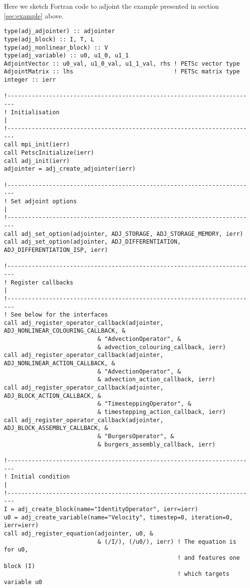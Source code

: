 \documentclass[10pt,authoryear]{elsarticle}
\begin{document}
Here we sketch Fortran code to adjoint the example presented in section \ref{sec:example} above.
\begin{verbatim}
type(adj_adjointer) :: adjointer
type(adj_block) :: I, T, L
type(adj_nonlinear_block) :: V
type(adj_variable) :: u0, u1_0, u1_1
AdjointVector :: u0_val, u1_0_val, u1_1_val, rhs ! PETSc vector type
AdjointMatrix :: lhs                             ! PETSc matrix type
integer :: ierr

!------------------------------------------------------------------------
! Initialisation                                                        |
!------------------------------------------------------------------------
call mpi_init(ierr)
call PetscInitialize(ierr)
call adj_init(ierr)
adjointer = adj_create_adjointer(ierr)

!------------------------------------------------------------------------
! Set adjoint options                                                  |
!------------------------------------------------------------------------
call adj_set_option(adjointer, ADJ_STORAGE, ADJ_STORAGE_MEMORY, ierr)
call adj_set_option(adjointer, ADJ_DIFFERENTIATION, ADJ_DIFFERENTIATION_ISP, ierr)

!------------------------------------------------------------------------
! Register callbacks                                                    |
!------------------------------------------------------------------------
! See below for the interfaces
call adj_register_operator_callback(adjointer, ADJ_NONLINEAR_COLOURING_CALLBACK, &
                           & "AdvectionOperator", &
                           & advection_colouring_callback, ierr)
call adj_register_operator_callback(adjointer, ADJ_NONLINEAR_ACTION_CALLBACK, &
                           & "AdvectionOperator", &
                           & advection_action_callback, ierr)
call adj_register_operator_callback(adjointer, ADJ_BLOCK_ACTION_CALLBACK, &
                           & "TimesteppingOperator", &
                           & timestepping_action_callback, ierr)
call adj_register_operator_callback(adjointer, ADJ_BLOCK_ASSEMBLY_CALLBACK, &
                           & "BurgersOperator", &
                           & burgers_assembly_callback, ierr)

!------------------------------------------------------------------------
! Initial condition                                                     |
!------------------------------------------------------------------------
I = adj_create_block(name="IdentityOperator", ierr=ierr)
u0 = adj_create_variable(name="Velocity", timestep=0, iteration=0, ierr=ierr)
call adj_register_equation(adjointer, u0, &
                           & (/I/), (/u0/), ierr) ! The equation is for u0,
                                                  ! and features one block (I)
                                                  ! which targets variable u0


\end{verbatim}
\end{document}
